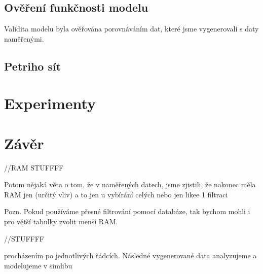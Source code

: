 \documentclass[a4paper, 11pt]{article}
\begin{document}
\subsection{Ověření funkčnosti modelu}
Validita modelu byla ověřována porovnáváním dat, které jsme vygenerovali s daty naměřenými.

\subsection{Petriho sít}

\section{Experimenty}

\section{Závěr}

//RAM STUFFFF

Potom nějaká věta o tom, že v naměřených datech, jsme zjistili, že nakonec měla RAM jen (určitý vliv) a to jen u vybírání celých nebo jen likee 1 filtraci

Pozn. Pokud používáme přesné filtrování pomocí databáze, tak bychom mohli i pro větší tabulky zvolit menší RAM. 

//STUFFFF


procházením po jednotlivých řádcích. Následné vygenerované data analyzujeme a modelujeme v simlibu\cite{simlib_web, simlib_zdroj}

\pagebreak
\newpage

\def\refname{Literatura}

\end{document}
